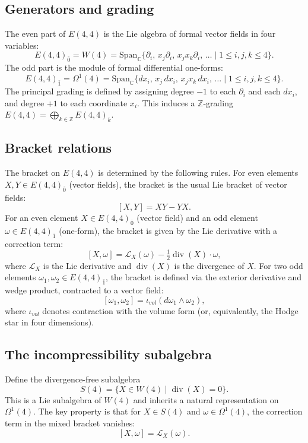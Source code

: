 \documentclass[reqno,10pt]{amsart}
\theoremstyle{plain}
\theoremstyle{definition}
\def\gE{E(4,4)}
\def\div{\operatorname{div}}
\begin{document}
\subsection{Generators and grading}

The even part of $\gE$ is the Lie algebra of formal vector fields in four variables:
\[
  \gE_{\bar{0}} = W(4) = \text{Span}_{\mathbb{C}}\{ \partial_i,\, x_j\partial_i,\, x_jx_k\partial_i,\,\ldots \mid 1\le i,j,k\le 4\}.
\]
The odd part is the module of formal differential one-forms:
\[
  \gE_{\bar{1}} = \Omega^1(4) = \text{Span}_{\mathbb{C}}\{ dx_i,\, x_j\,dx_i,\, x_jx_k\,dx_i,\,\ldots \mid 1\le i,j,k\le 4\}.
\]
The principal grading is defined by assigning degree $-1$ to each $\partial_i$ and each $dx_i$, and degree $+1$ to each coordinate $x_i$. This induces a $\mathbb{Z}$-grading $\gE = \bigoplus_{k\in\mathbb{Z}} \gE_k$.

\subsection{Bracket relations}

The bracket on $\gE$ is determined by the following rules. For even elements $X,Y\in \gE_{\bar{0}}$ (vector fields), the bracket is the usual Lie bracket of vector fields:
\[
  [X,Y] = XY - YX.
\]
For an even element $X\in\gE_{\bar{0}}$ (vector field) and an odd element $\omega\in\gE_{\bar{1}}$ (one-form), the bracket is given by the Lie derivative with a correction term:
\[
  [X,\omega] = \mathcal{L}_X(\omega) - \tfrac{1}{2}\div(X)\cdot\omega,
\]
where $\mathcal{L}_X$ is the Lie derivative and $\div(X)$ is the divergence of $X$. For two odd elements $\omega_1,\omega_2\in\gE_{\bar{1}}$, the bracket is defined via the exterior derivative and wedge product, contracted to a vector field:
\[
  [\omega_1,\omega_2] = \iota_{vol}(d\omega_1\wedge\omega_2),
\]
where $\iota_{vol}$ denotes contraction with the volume form (or, equivalently, the Hodge star in four dimensions).

\subsection{The incompressibility subalgebra}

Define the divergence-free subalgebra
\[
  S(4) = \{ X\in W(4) \mid \div(X)=0\}.
\]
This is a Lie subalgebra of $W(4)$ and inherits a natural representation on $\Omega^1(4)$. The key property is that for $X\in S(4)$ and $\omega\in\Omega^1(4)$, the correction term in the mixed bracket vanishes:
\[
  [X,\omega] = \mathcal{L}_X(\omega).
\]
\end{document}
